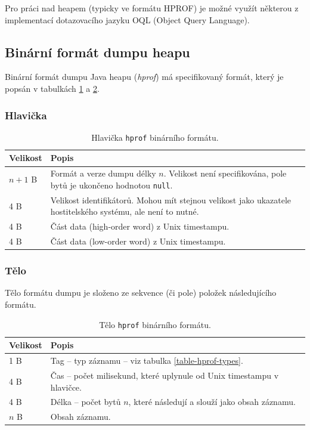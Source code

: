Pro práci nad heapem  (typicky ve formátu HPROF) je možné využít některou z implementací dotazovacího jazyku OQL (Object Query Language).

\subsection{Binární formát dumpu heapu}
\label{hprof-format}
Binární formát dumpu Java heapu (\textit{hprof}) má specifikovaný formát, který je popsán v tabulkách \ref{table-hprof-header} a \ref{table-hprof-body}.

\subsubsection{Hlavička}
\begin{table}[ht!]
    \begin{tabularx}{\textwidth}{|l|X|}
        \hline
    \textbf{Velikost} & \textbf{Popis} \\ \hline \hline
    $n + 1$ B & Formát a verze dumpu délky $n$. Velikost není specifikována, pole bytů je ukončeno hodnotou \texttt{null}. \\
    4 B & Velikost identifikátorů. Mohou mít stejnou velikost jako ukazatele hostitelského systému, ale není to nutné. \\
    4 B & Část data (high-order word) z Unix timestampu. \\
    4 B & Část data (low-order word) z Unix timestampu.  \\ \hline                                                                   
    \end{tabularx}
    \caption{Hlavička \texttt{hprof} binárního formátu.}
    \label{table-hprof-header}
\end{table}

\subsubsection{Tělo}
Tělo formátu dumpu je složeno ze sekvence (či pole) položek následujícího formátu.
\begin{table}[ht!]
    \begin{tabularx}{\textwidth}{|l|X|}
        \hline
    \textbf{Velikost} & \textbf{Popis} \\ \hline \hline
    1 B & Tag -- typ záznamu -- viz tabulka \ref{table-hprof-types}. \\
    4 B & Čas -- počet milisekund, které uplynule od Unix timestampu v hlavičce. \\
    4 B & Délka -- počet bytů $n$, které následují a slouží jako obsah záznamu. \\
    $n$ B & Obsah záznamu. \\ \hline                                                                   
    \end{tabularx}
    \caption{Tělo \texttt{hprof} binárního formátu.}
    \label{table-hprof-body}
\end{table}


